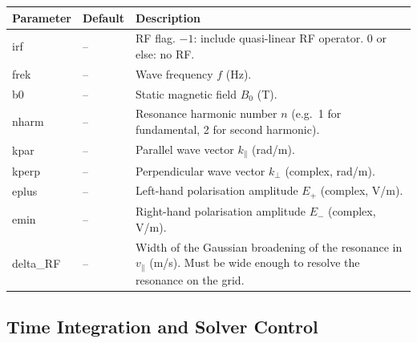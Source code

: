\documentclass[11pt,a4paper]{article}
\newcommand{\vpa}{v_\parallel}
\begin{document}
\begin{longtable}{>{\ttfamily}p{3.2cm} p{1.5cm} p{9cm}}
\toprule
\normalfont Parameter & Default & Description \\
\midrule
\endhead
\bottomrule
\endlastfoot

irf & -- &
  RF flag.
  $-1$: include quasi-linear RF operator.
  $0$ or else: no RF. \\[4pt]

frek & -- &
  Wave frequency $f$ (Hz). \\[4pt]

b0 & -- &
  Static magnetic field $B_0$ (T). \\[4pt]

nharm & -- &
  Resonance harmonic number $n$ (e.g.\ 1 for fundamental, 2 for second
  harmonic). \\[4pt]

kpar & -- &
  Parallel wave vector $k_\parallel$ (rad/m). \\[4pt]

kperp & -- &
  Perpendicular wave vector $k_\perp$ (complex, rad/m). \\[4pt]

eplus & -- &
  Left-hand polarisation amplitude $E_+$ (complex, V/m). \\[4pt]

emin & -- &
  Right-hand polarisation amplitude $E_-$ (complex, V/m). \\[4pt]

delta\_RF & -- &
  Width of the Gaussian broadening of the resonance in $\vpa$ (m/s).
  Must be wide enough to resolve the resonance on the grid. \\[4pt]

\end{longtable}

\subsection{Time Integration and Solver Control}
\end{document}
